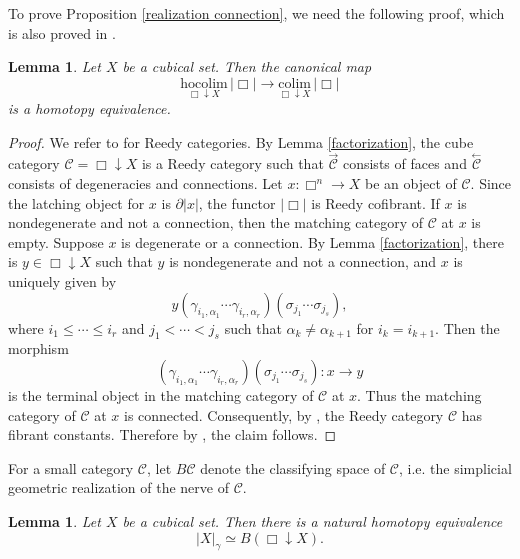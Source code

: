 \documentclass[oneside, 12pt]{amsart}
\numberwithin{equation}{section}
\theoremstyle{plain}
\newtheorem{lemma}[theorem]{Lemma}
\theoremstyle{definition}
\theoremstyle{remark}
\begin{document}
	
	To prove Proposition \ref{realization connection}, we need the following proof, which is also proved in \cite[Proposition 3.12, Corollary 3.14]{ACK}.
	\begin{lemma}
		\label{cube cat hocolim}
		Let $X$ be a cubical set. Then the canonical map
		\[
		\underset{\Box\downarrow X}{\mathrm{hocolim}}\,|\Box|\to\underset{\Box\downarrow X}{\mathrm{colim}}\,|\Box|
		\]
		is a homotopy equivalence.
	\end{lemma}
	
	\begin{proof}
		We refer to \cite{H} for Reedy categories. By Lemma \ref{factorization}, the cube category $\mathcal{C}=\Box\downarrow X$ is a Reedy category such that $\overset{\rightarrow}{\mathcal{C}}$ consists of faces and $\overset{\leftarrow}{\mathcal{C}}$ consists of degeneracies and connections. Let $x\colon\Box^n\to X$ be an object of $\mathcal{C}$. Since the latching object for $x$ is $\partial|x|$, the functor $|\Box|$ is Reedy cofibrant. If $x$ is nondegenerate and not a connection, then the matching category of $\mathcal{C}$ at $x$ is empty. Suppose $x$ is degenerate or a connection. By Lemma \ref{factorization}, there is $y\in\Box\downarrow X$ such that $y$ is nondegenerate and not a connection, and $x$ is uniquely given by $$y(\gamma_{i_1,\alpha_1}\cdots\gamma_{i_r,\alpha_r})(\sigma_{j_1}\cdots\sigma_{j_s}),$$
		where $i_1\le\cdots\le i_r$ and $j_1<\cdots<j_s$ such that $\alpha_k\ne\alpha_{k+1}$ for $i_k=i_{k+1}$. Then the morphism
		\[
		(\gamma_{i_1,\alpha_1}\cdots\gamma_{i_r,\alpha_r})(\sigma_{j_1}\cdots\sigma_{j_s})\colon x\to y
		\]
		is the terminal object in the matching category of $\mathcal{C}$ at $x$. %
		Thus the matching category of $\mathcal{C}$ at $x$ is connected. Consequently, by \cite[Proposition 15.10.2]{H}, the Reedy category $\mathcal{C}$ has fibrant constants. Therefore by \cite[Proposition 19.9.1]{H}, the claim follows.
	\end{proof}
	
	
	
	For a small category $\mathcal{C}$, let $B\mathcal{C}$ denote the classifying space of $\mathcal{C}$, i.e. the simplicial geometric realization of the nerve of $\mathcal{C}$.
	
	
	
	\begin{lemma}
		\label{cube cat classifying space}
		Let $X$ be a cubical set. Then there is a natural homotopy equivalence
		\[
		|X|_\gamma\simeq B(\Box\downarrow X).
		\]
	\end{lemma}
	
\end{document}
